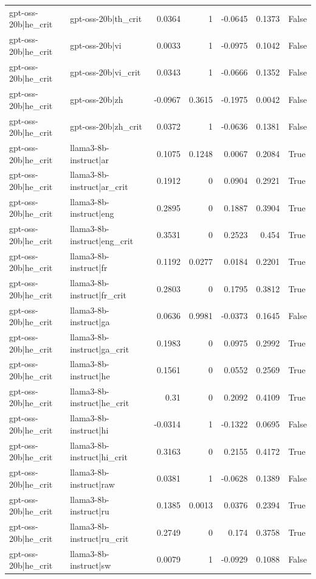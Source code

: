 \begin{table}
\begin{tabular}{l l r r r r l}
gpt-oss-20b|he_crit & gpt-oss-20b|th_crit & 0.0364 & 1 & -0.0645 & 0.1373 & False \\
gpt-oss-20b|he_crit & gpt-oss-20b|vi & 0.0033 & 1 & -0.0975 & 0.1042 & False \\
gpt-oss-20b|he_crit & gpt-oss-20b|vi_crit & 0.0343 & 1 & -0.0666 & 0.1352 & False \\
gpt-oss-20b|he_crit & gpt-oss-20b|zh & -0.0967 & 0.3615 & -0.1975 & 0.0042 & False \\
gpt-oss-20b|he_crit & gpt-oss-20b|zh_crit & 0.0372 & 1 & -0.0636 & 0.1381 & False \\
gpt-oss-20b|he_crit & llama3-8b-instruct|ar & 0.1075 & 0.1248 & 0.0067 & 0.2084 & True \\
gpt-oss-20b|he_crit & llama3-8b-instruct|ar_crit & 0.1912 & 0 & 0.0904 & 0.2921 & True \\
gpt-oss-20b|he_crit & llama3-8b-instruct|eng & 0.2895 & 0 & 0.1887 & 0.3904 & True \\
gpt-oss-20b|he_crit & llama3-8b-instruct|eng_crit & 0.3531 & 0 & 0.2523 & 0.454 & True \\
gpt-oss-20b|he_crit & llama3-8b-instruct|fr & 0.1192 & 0.0277 & 0.0184 & 0.2201 & True \\
gpt-oss-20b|he_crit & llama3-8b-instruct|fr_crit & 0.2803 & 0 & 0.1795 & 0.3812 & True \\
gpt-oss-20b|he_crit & llama3-8b-instruct|ga & 0.0636 & 0.9981 & -0.0373 & 0.1645 & False \\
gpt-oss-20b|he_crit & llama3-8b-instruct|ga_crit & 0.1983 & 0 & 0.0975 & 0.2992 & True \\
gpt-oss-20b|he_crit & llama3-8b-instruct|he & 0.1561 & 0 & 0.0552 & 0.2569 & True \\
gpt-oss-20b|he_crit & llama3-8b-instruct|he_crit & 0.31 & 0 & 0.2092 & 0.4109 & True \\
gpt-oss-20b|he_crit & llama3-8b-instruct|hi & -0.0314 & 1 & -0.1322 & 0.0695 & False \\
gpt-oss-20b|he_crit & llama3-8b-instruct|hi_crit & 0.3163 & 0 & 0.2155 & 0.4172 & True \\
gpt-oss-20b|he_crit & llama3-8b-instruct|raw & 0.0381 & 1 & -0.0628 & 0.1389 & False \\
gpt-oss-20b|he_crit & llama3-8b-instruct|ru & 0.1385 & 0.0013 & 0.0376 & 0.2394 & True \\
gpt-oss-20b|he_crit & llama3-8b-instruct|ru_crit & 0.2749 & 0 & 0.174 & 0.3758 & True \\
gpt-oss-20b|he_crit & llama3-8b-instruct|sw & 0.0079 & 1 & -0.0929 & 0.1088 & False \\

\end{tabular}
\end{table}
